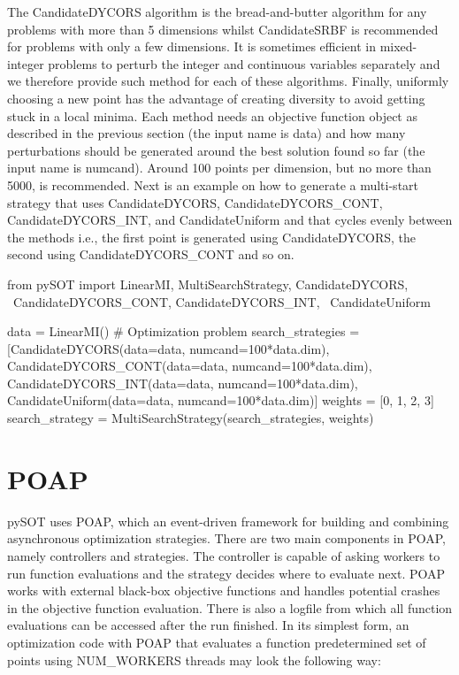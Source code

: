 \documentclass[]{article}
\begin{document}
The CandidateDYCORS algorithm is the bread-and-butter algorithm for any problems with more than 5 dimensions whilst CandidateSRBF is recommended for problems with only a few dimensions. It is sometimes efficient in mixed-integer problems to perturb the integer and continuous variables separately and we therefore provide such method for each of these algorithms. Finally, uniformly choosing a new point has the advantage of creating diversity to avoid getting stuck in a local minima. Each method needs an objective function object as described in the previous section (the input name is data) and how many perturbations should be generated around the best solution found so far (the input name is numcand). Around 100 points per dimension, but no more than 5000, is recommended. Next is an example on how to generate a multi-start strategy that uses CandidateDYCORS, CandidateDYCORS\_CONT, CandidateDYCORS\_INT, and CandidateUniform and that cycles evenly between the methods i.e., the first point is generated using CandidateDYCORS, the second using CandidateDYCORS\_CONT and so on.
\begin{python}
from pySOT import LinearMI, MultiSearchStrategy, CandidateDYCORS, \
			  CandidateDYCORS_CONT, CandidateDYCORS_INT, \
			  CandidateUniform

data = LinearMI()  # Optimization problem
search_strategies = [CandidateDYCORS(data=data, numcand=100*data.dim),
                     CandidateDYCORS_CONT(data=data, numcand=100*data.dim),
                     CandidateDYCORS_INT(data=data, numcand=100*data.dim),
                     CandidateUniform(data=data, numcand=100*data.dim)]
weights = [0, 1, 2, 3]
search_strategy = MultiSearchStrategy(search_strategies, weights)
\end{python}

\section{POAP}
pySOT uses POAP, which an event-driven framework for building and combining asynchronous optimization strategies. There are two main components in POAP, namely controllers and strategies. The controller is  capable of asking workers to run function evaluations and the strategy decides where to evaluate next. POAP works with external black-box objective functions and handles potential crashes in the objective function evaluation. There is also a logfile from which all function evaluations can be accessed after the run finished. In its simplest form, an optimization code with POAP that evaluates a function predetermined set of points using NUM\_WORKERS threads may look the following way:
\end{document}
